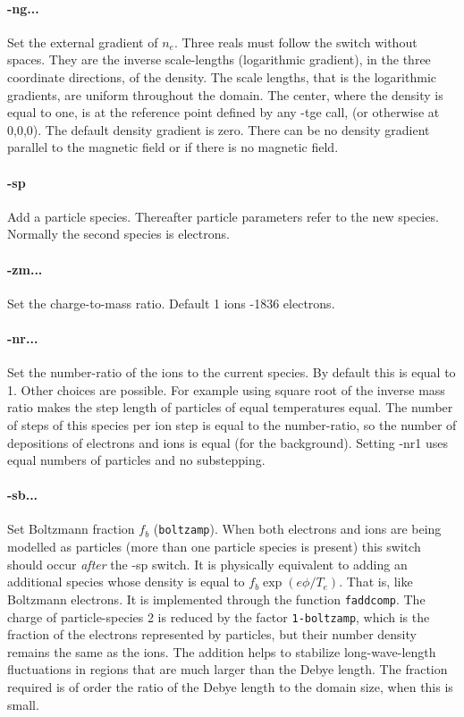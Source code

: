 \documentclass[12pt]{article}
\begin{document}
\paragraph{-ng...} Set the external gradient of $n_e$. Three reals
must follow the switch without spaces. They are the inverse
scale-lengths (logarithmic gradient), in the three coordinate
directions, of the density. The scale lengths, that is the
logarithmic gradients, are uniform throughout the domain. The center,
where the density is equal to one, is at the reference point defined
by any -tge call, (or otherwise at 0,0,0). The default density gradient is zero. There can be
no density gradient parallel to the magnetic field or if there is no
magnetic field.

\paragraph{-sp} Add a particle species. Thereafter particle parameters
refer to the new species. Normally the second species is electrons.

\paragraph{-zm...} Set the charge-to-mass ratio. Default 1 ions -1836
electrons.

\paragraph{-nr...} Set the number-ratio of the ions to the current
species. By default this is equal to 1. Other choices are
possible. For example using square root of the inverse mass ratio
makes the step length of particles of equal temperatures equal. The
number of steps of this species per ion step is equal to the
number-ratio, so the number of depositions of electrons and ions is
equal (for the background).  Setting -nr1 uses equal numbers of
particles and no substepping.

\paragraph{-sb...} Set Boltzmann fraction $f_b$
(\verb!boltzamp!). When both electrons and ions are being modelled as
particles (more than one particle species is present) this switch
should occur \emph{after} the -sp switch. It is physically equivalent
to adding an additional species whose density is equal to
$f_b\exp(e\phi/T_e)$. That is, like Boltzmann electrons.  It is
implemented through the function \verb!faddcomp!. The charge of
particle-species 2 is reduced by the factor \verb!1-boltzamp!, which is
the fraction of the electrons represented by particles, but their
number density remains the same as the ions.  The addition helps to stabilize
long-wave-length fluctuations in regions that are much larger than the
Debye length. The fraction required is of order the ratio of the Debye
length to the domain size, when this is small.
\end{document}

